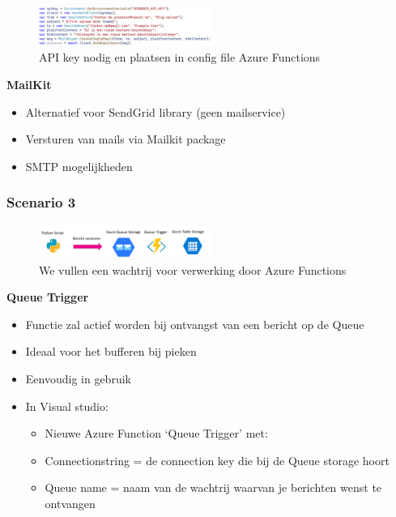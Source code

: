 \documentclass{article}
\newcommand{\bold}[1]{\textbf{#1}}
\begin{document}
\begin{figure}[H]
    \centering
    \includegraphics[width=0.5\textwidth]{scenario-2-3.png}
    \caption{API key nodig en plaatsen in config file Azure Functions}
\end{figure}


\bold{MailKit}

\begin{itemize}
    \item Alternatief voor SendGrid library (geen mailservice)
    \item Versturen van mails via Mailkit package
    \item SMTP mogelijkheden
\end{itemize}

\subsubsection{Scenario 3}

\begin{figure}[H]
    \centering
    \includegraphics[width=0.5\textwidth]{azure-storage-scenario-3.png}
    \caption{We vullen een wachtrij voor verwerking door Azure Functions}
\end{figure}

\bold{Queue Trigger}

\begin{itemize}
    \item Functie zal actief worden bij ontvangst van een bericht op de Queue
    \item Ideaal voor het bufferen bij pieken
    \item Eenvoudig in gebruik
    \item In Visual studio: 
    \begin{itemize}
        \item Nieuwe Azure Function `Queue Trigger' met:
        \item Connectionstring = de connection key die bij de Queue storage hoort
        \item Queue name = naam van de wachtrij waarvan je berichten wenst te ontvangen
    \end{itemize}
\end{itemize}
\end{document}
